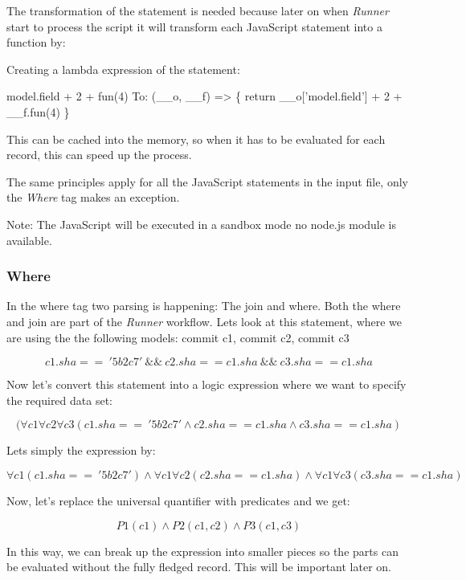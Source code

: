The transformation of the statement is needed because later on when \textit{Runner} start to process the script
it will transform each JavaScript statement into a function by:

Creating a lambda expression of the statement: 

model.field + 2 + fun(4)\newline 
To:\newline
(\_\_o, \_\_f) => \{ return \_\_o['model.field'] + 2 + \_\_f.fun(4) \}\newline

This can be cached into the memory, so when it has to be evaluated for each record, this can speed up the process.

The same principles apply for all the JavaScript statements in the input file, only the \textit{Where} tag makes an exception. 

Note: The JavaScript will be executed in a sandbox mode no node.js module is
available. 

\newpage
\subsubsection{Where}

In the where tag two parsing is happening: The join and where. Both the where and join are part of the \textit{Runner} workflow. Lets look at this statement, where we are using the the following models: commit c1, commit c2, commit c3

\[ c1.sha ==\ '5b2c7'\ \&\&\ c2.sha == c1.sha\ \&\&\ c3.sha == c1.sha\]

Now let’s convert this statement into a logic expression where we want to specify the required
data set:

\[( \forall{c1}\forall{c2}\forall{c3}(c1.sha ==\ '5b2c7' \wedge c2.sha == c1.sha \wedge c3.sha == c1.sha)\]

Lets simply the expression by:

\[ \forall{c1}(c1.sha ==\ '5b2c7') \wedge \forall{c1}\forall{c2}(c2.sha == c1.sha) \wedge \forall{c1}\forall{c3}(c3.sha == c1.sha)\]

Now, let’s replace the universal quantifier with predicates and we get:

\[ P1(c1) \wedge P2(c1,c2) \wedge P3(c1,c3)\]

In this way, we can break up the expression into smaller pieces so the parts can be evaluated without the fully fledged record. This will be important later on.


